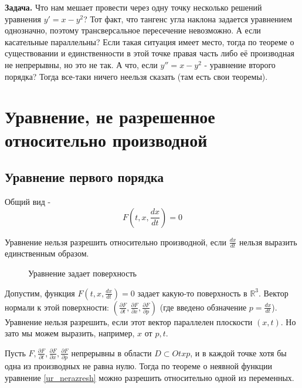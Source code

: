 \textbf{Задача.} Что нам мешает провести через одну точку несколько
решений уравнения $y'=x-y^2$? Тот факт, что тангенс угла наклона задается
уравнением однозначно, поэтому трансверсальное пересечение невозможно.
А если касательные параллельны? Если такая ситуация имеет место, тогда по 
теореме о существовании и единственности в этой точке правая часть либо
её производная не непрерывны, но это не так. А что, если $y''=x-y^2$ - 
уравнение второго порядка? Тогда все-таки ничего неельзя сказать (там есть
свои теоремы). 
\section{Уравнение, не разрешенное относительно производной}
\subsection{Уравнение первого порядка}
Общий вид - 
\begin{equation}
    \label{ur_nerazresh}
F\left( t,x,\frac{dx}{dt} \right) = 0
\end{equation}

Уравнение нельзя разрешить относительно производной, если $\frac{dx}{dt}$ 
нельзя выразить единственным образом. 

\begin{figure}[H]
    \centering
    
    \caption{Уравнение задает поверхность}
    \label{fig:}
\end{figure}

Допустим, функция $F( t,x,\frac{dx}{dt}) = 0$ задает какую-то поверхность в 
$\mathbb{R}^3$. Вектор нормали к этой поверхности:
 $\left( \frac{\partial F}{\partial t},\frac{\partial F}{\partial x},
 \frac{\partial F}{\partial p} \right) $ (где введено обзначение
 $p=\frac{dx}{dt}$). Уравнение нельзя разрешить, если этот вектор 
 параллелен плоскости $(x,t)$. Но зато мы можем выразить, например, 
 $x$ от  $p,t$.

 Пусть $F,\frac{\partial F}{\partial t},\frac{\partial F}{\partial x},
 \frac{\partial F}{\partial p}$ непрерывны в области $D\subset Otxp$, 
 и в каждой точке хотя бы одна из производных не равна нулю. Тогда по 
 теореме о неявной функции уравнение \ref{ur_nerazresh} можно
 разрешить относительно одной из переменных. 

